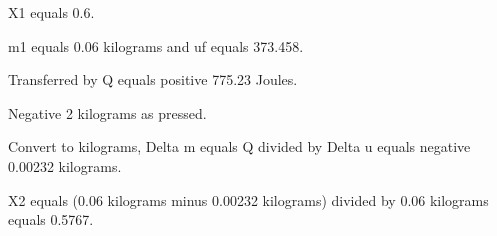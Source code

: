 X1 equals 0.6.

m1 equals 0.06 kilograms and uf equals 373.458.

Transferred by Q equals positive 775.23 Joules.

Negative 2 kilograms as pressed.

Convert to kilograms, Delta m equals Q divided by Delta u equals negative 0.00232 kilograms.

X2 equals (0.06 kilograms minus 0.00232 kilograms) divided by 0.06 kilograms equals 0.5767.